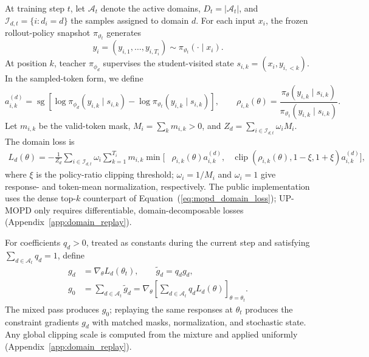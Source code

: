 \documentclass{article}
\begin{document}
At training step $t$, let $\mathcal A_t$ denote the active domains,
$D_t=|\mathcal A_t|$, and $\mathcal I_{d,t}=\{i:d_i=d\}$ the samples assigned
to domain $d$. For each input $x_i$, the frozen rollout-policy snapshot
$\pi_{\vartheta_t}$ generates
\[
y_i=(y_{i,1},\ldots,y_{i,T_i})
\sim\pi_{\vartheta_t}(\cdot\mid x_i).
\]
At position $k$, teacher $\pi_{\phi_d}$ supervises the student-visited state
$s_{i,k}=(x_i,y_{i,<k})$. In the sampled-token form, we define
\begin{equation}
a_{i,k}^{(d)}
=\operatorname{sg}\!\left[
\log\pi_{\phi_d}(y_{i,k}\mid s_{i,k})-
\log\pi_{\vartheta_t}(y_{i,k}\mid s_{i,k})\right],
\qquad
\rho_{i,k}(\theta)=
\frac{\pi_\theta(y_{i,k}\mid s_{i,k})}
     {\pi_{\vartheta_t}(y_{i,k}\mid s_{i,k})}.
\label{eq:mopd_advantage}
\end{equation}
Let $m_{i,k}$ be the valid-token mask, $M_i=\sum_km_{i,k}>0$, and
$Z_d=\sum_{i\in\mathcal I_{d,t}}\omega_iM_i$. The domain loss is
\begin{equation}
\begin{aligned}
L_d(\theta)=-\frac{1}{Z_d}
\sum_{i\in\mathcal I_{d,t}}\omega_i
\sum_{k=1}^{T_i}m_{i,k}
\min\!\Big[
&\rho_{i,k}(\theta)a_{i,k}^{(d)},
&\operatorname{clip}(\rho_{i,k}(\theta),1-\xi,1+\xi)a_{i,k}^{(d)}
\Big],
\end{aligned}
\label{eq:mopd_domain_loss}
\end{equation}
where $\xi$ is the policy-ratio clipping threshold; $\omega_i=1/M_i$ and
$\omega_i=1$ give response- and token-mean normalization, respectively. The
public implementation uses the dense top-$k$ counterpart of
Equation~(\ref{eq:mopd_domain_loss}); UP-MOPD only requires differentiable,
domain-decomposable losses (Appendix~\ref{app:domain_replay}).

For coefficients $q_d>0$, treated as constants during the current step and
satisfying $\sum_{d\in\mathcal A_t}q_d=1$, define
\begin{equation}
\begin{aligned}
g_d&=\nabla_\theta L_d(\theta_t),\qquad
\widetilde g_d=q_dg_d,\\
g_0&=\sum_{d\in\mathcal A_t}\widetilde g_d
=\nabla_\theta\!\left[
\sum_{d\in\mathcal A_t}q_dL_d(\theta)
\right]_{\theta=\theta_t}.
\end{aligned}
\label{eq:up_mixture}
\end{equation}
The mixed pass produces $g_0$; replaying the same responses at $\theta_t$
produces the constraint gradients $g_d$ with matched masks, normalization,
and stochastic state. Any global clipping scale is computed from the mixture
and applied uniformly (Appendix~\ref{app:domain_replay}).
\end{document}
